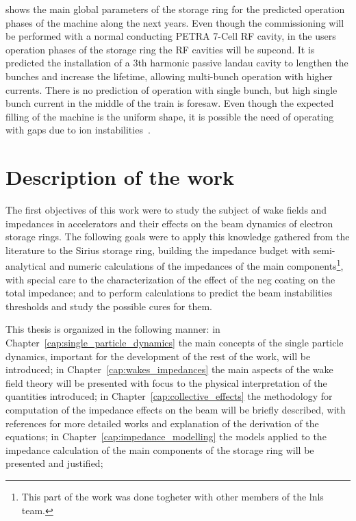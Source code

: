     shows the main global parameters of the storage ring for the predicted operation phases of the machine along the next years. Even though the commissioning will be performed with a normal conducting PETRA 7-Cell RF cavity, in the users operation phases of the storage ring the RF cavities will be \gls{supcond}. It is predicted the installation of a 3th harmonic passive landau cavity to lengthen the bunches and increase the lifetime, allowing multi-bunch operation with higher currents. There is no prediction of operation with single bunch, but high single bunch current in the middle of the train is foresaw. Even though the expected filling of the machine is the uniform shape, it is possible the need of operating with gaps due to ion instabilities~\cite{Wang2013a,Nagaoka2014}.

\section{Description of the work}

    The first objectives of this work were to study the subject of wake fields and impedances in accelerators and their effects on the beam dynamics of electron storage rings. The following goals were to apply this knowledge gathered from the literature to the Sirius storage ring, building the impedance budget with semi-analytical and numeric calculations of the impedances of the main components\footnote{This part of the work was done togheter with other members of the \gls{lnls} team.}, with special care to the characterization of the effect of the \gls{neg} coating on the total impedance; and to perform calculations to predict the beam instabilities thresholds and study the possible cures for them.

    This thesis is organized in the following manner: in Chapter~\ref{cap:single_particle_dynamics} the main concepts of the single particle dynamics, important for the development of the rest of the work, will be introduced; in Chapter~\ref{cap:wakes_impedances} the main aspects of the wake field theory will be presented with focus to the physical interpretation of the quantities introduced; in Chapter~\ref{cap:collective_effects} the methodology for computation of the impedance effects on the beam will be briefly described, with references for more detailed works and explanation of the derivation of the equations; in Chapter~\ref{cap:impedance_modelling} the models applied to the impedance calculation of the main components of the storage ring will be presented and justified;


